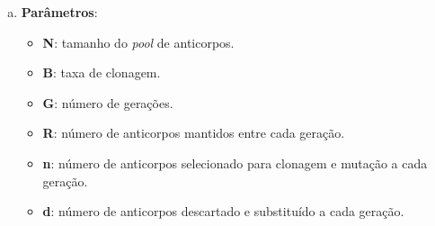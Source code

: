 \begin{enumerate}[a)]
    \item \textbf{Parâmetros}:
        \begin{itemize}

            \item \textbf{N}: tamanho do \emph{pool} de anticorpos.

            \item \textbf{B}: taxa de clonagem.

            \item \textbf{G}: número de gerações.

            \item \textbf{R}: número de anticorpos mantidos entre cada geração.

            \item \textbf{n}: número de anticorpos selecionado para clonagem e mutação a cada geração.

            \item \textbf{d}: número de anticorpos descartado e substituído a cada geração.
        \end{itemize}
\end{enumerate}
